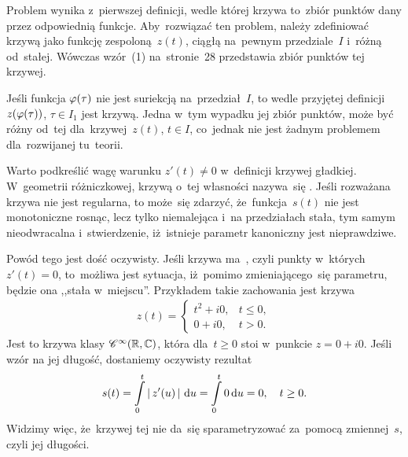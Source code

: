 \documentclass[a4paper,11pt]{article}
\begin{document}
Problem wynika z~pierwszej definicji, wedle której krzywa to~zbiór
punktów dany przez odpowiednią funkcje. Aby~rozwiązać ten problem,
należy zdefiniować krzywą jako funkcję zespoloną~$z( t )$, ciągłą
na~pewnym przedziale~$I$ i~różną od~stałej. Wówczas wzór~(1)
na~stronie~28 przedstawia zbiór punktów tej krzywej.

\vspace{\spaceFour}


\start {} Jeśli funkcja $\varphi( \tau )$ nie jest suriekcją
na~przedział~$I$, to wedle przyjętej definicji~$z( \varphi( \tau ) )$,
$\tau \in I_{ 1 }$ jest krzywą. Jedna w~tym wypadku jej zbiór punktów,
może być różny od~tej dla~krzywej~$z( t )$, $t \in I$, co~jednak nie
jest żadnym problemem dla~rozwijanej tu~teorii.

\vspace{\spaceFour}


\start {} Warto podkreślić wagę warunku $z'( t ) \neq 0$
w~definicji krzywej gładkiej. W~geometrii różniczkowej, krzywą o~tej
własności nazywa~się . Jeśli rozważana krzywa nie jest
regularna, to może~się zdarzyć, że~funkcja~$s( t )$ nie jest
monotoniczne rosnąc, lecz tylko niemalejąca i~na przedziałach stała,
tym samym nieodwracalna i~stwierdzenie, iż~istnieje parametr
kanoniczny jest nieprawdziwe.

Powód tego jest dość oczywisty. Jeśli krzywa ma~,
czyli punkty w~których~$z'( t ) = 0$, to~możliwa jest sytuacja,
iż~pomimo zmieniającego~się parametru, będzie ona ,,stała w~miejscu''.
Przykładem takie zachowania jest krzywa
\begin{equation}
  \label{eq:Leja-25}
  \begin{split}
    z( t ) =
    \begin{cases}
      t^{ 2 } + i 0, & t \leq 0, \\
      0 + i 0, & t > 0.
    \end{cases}
  \end{split}
\end{equation}
Jest to krzywa klasy $\mathcal{C}^{ \infty }( \mathbb{R}, \mathbb{C} )$, która dla~$t \geq 0$ stoi
w~punkcie $z = 0 + i 0$. Jeśli wzór na jej długość, dostaniemy
oczywisty rezultat
\begin{equation}
  \label{eq:Leja-26}
  \begin{split}
    s( t ) = \int\limits_{ 0 }^{ t } \left| \,  z'( u )  \, \right| \, \mathrm{d} u = \int\limits_{ 0 }^{
      t } 0 \, \mathrm{d} u = 0, \quad t \geq 0.
  \end{split}
\end{equation}
Widzimy więc, że~krzywej tej nie da~się sparametryzować za~pomocą
zmiennej~$s$, czyli jej długości.
\end{document}
